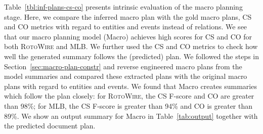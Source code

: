 \documentclass[11pt,a4paper]{article}
\begin{document}
Table~\ref{tbl:inf-plans-cs-co} presents intrinsic evaluation of the
macro planning stage. Here, we compare the inferred macro plan with
the gold macro plans, CS and CO metrics with regard to entities and events instead of
relations.  We see that our macro planning model (Macro) achieves high
scores for CS and CO for both \textsc{RotoWire} and MLB.
We further used the CS and CO metrics to check how well the generated
summary follows the (predicted) plan. We followed the steps in
Section~\ref{sec:macro-plan-constr} and reverse engineered macro plans
from the model summaries and compared these extracted plans with the
original macro plans with regard to entities and events. We found
that Macro creates summaries which follow the plan closely:
for \textsc{RotoWire}, the CS F-score and CO are greater than 98\%; 
for MLB, the CS F-score is greater than 94\% and CO
is greater than 89\%. We show an output summary for Macro in Table~\ref{tab:output} 
together with the predicted document
plan.
\end{document}
